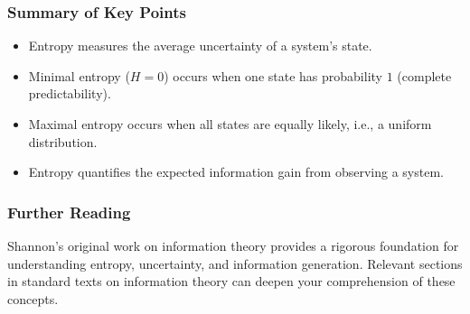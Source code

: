 \documentclass[12pt,a4paper]{article}
\begin{document}
\subsubsection*{Summary of Key Points}
\begin{itemize}
    \item Entropy measures the average uncertainty of a system's state.
    \item Minimal entropy ($H = 0$) occurs when one state has probability $1$ (complete predictability).
    \item Maximal entropy occurs when all states are equally likely, i.e., a uniform distribution.
    \item Entropy quantifies the expected information gain from observing a system.
\end{itemize}

\subsubsection*{Further Reading}
Shannon's original work on information theory provides a rigorous foundation for understanding entropy, uncertainty, and information generation. Relevant sections in standard texts on information theory can deepen your comprehension of these concepts.
\end{document}
